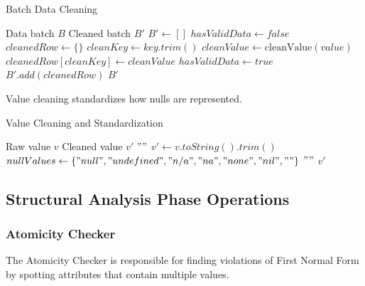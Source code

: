 \documentclass[sigconf]{acmart}
\begin{document}
\begin{algorithm}
\caption{Batch Data Cleaning}
\label{alg:batch-clean}
\begin{algorithmic}[1]
\REQUIRE Data batch $B$
\ENSURE Cleaned batch $B'$
\STATE $B' \leftarrow []$
    \STATE $hasValidData \leftarrow false$
    \STATE $cleanedRow \leftarrow \{\}$
        \STATE $cleanKey \leftarrow key.trim()$
        \STATE $cleanValue \leftarrow \text{cleanValue}(value)$
            \STATE $cleanedRow[cleanKey] \leftarrow cleanValue$
                \STATE $hasValidData \leftarrow true$
            \ENDIF
        \ENDIF
    \ENDFOR
        \STATE $B'.add(cleanedRow)$
    \ENDIF
\ENDFOR
\STATE \RETURN $B'$
\end{algorithmic}
\end{algorithm}

Value cleaning standardizes how nulls are represented.

\begin{algorithm}
\caption{Value Cleaning and Standardization}
\label{alg:clean-value}
\begin{algorithmic}[1]
\REQUIRE Raw value $v$
\ENSURE Cleaned value $v'$
    \STATE \RETURN $""$
\ENDIF
\STATE $v' \leftarrow v.toString().trim()$
\STATE $nullValues \leftarrow \{"null", "undefined", "n/a", "na", "none", "nil", ""\}$
    \STATE \RETURN $""$
\ENDIF
\STATE \RETURN $v'$
\end{algorithmic}
\end{algorithm}

\subsection{Structural Analysis Phase Operations}

\subsubsection{Atomicity Checker}

The Atomicity Checker is responsible for finding violations of First Normal Form by spotting attributes that contain multiple values.
\end{document}
